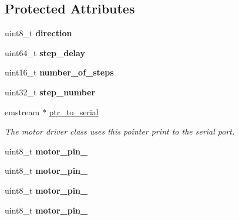 \subsection*{\-Protected \-Attributes}
\begin{DoxyCompactItemize}
\item 
\hypertarget{classStepper_a4ae0d2fd881970dd6a4b6e1a8334f691}{uint8\-\_\-t {\bfseries direction}}\label{classStepper_a4ae0d2fd881970dd6a4b6e1a8334f691}

\item 
\hypertarget{classStepper_a89678370d4e08ef2883e4e3d39f25859}{uint64\-\_\-t {\bfseries step\-\_\-delay}}\label{classStepper_a89678370d4e08ef2883e4e3d39f25859}

\item 
\hypertarget{classStepper_a927b4d28baddc7a61018e8e505e7d355}{uint16\-\_\-t {\bfseries number\-\_\-of\-\_\-steps}}\label{classStepper_a927b4d28baddc7a61018e8e505e7d355}

\item 
\hypertarget{classStepper_a5b613cc0dbed645425d86b7571316d8f}{uint32\-\_\-t {\bfseries step\-\_\-number}}\label{classStepper_a5b613cc0dbed645425d86b7571316d8f}

\item 
\hypertarget{classStepper_a2d66212be56a13730fd79853cf95e09f}{emstream $\ast$ \hyperlink{classStepper_a2d66212be56a13730fd79853cf95e09f}{ptr\-\_\-to\-\_\-serial}}\label{classStepper_a2d66212be56a13730fd79853cf95e09f}

\begin{DoxyCompactList}\small\item\em \-The motor driver class uses this pointer print to the serial port. \end{DoxyCompactList}\item 
\hypertarget{classStepper_aae97c5e4391150f951d06bf0261224be}{uint8\-\_\-t {\bfseries motor\-\_\-pin\-\_}}\label{classStepper_aae97c5e4391150f951d06bf0261224be}

\item 
\hypertarget{classStepper_a7587a846fb69d2d9ff5e262e6899b30e}{uint8\-\_\-t {\bfseries motor\-\_\-pin\-\_}}\label{classStepper_a7587a846fb69d2d9ff5e262e6899b30e}

\item 
\hypertarget{classStepper_a787bb30fd11e35cace30694337b27bac}{uint8\-\_\-t {\bfseries motor\-\_\-pin\-\_}}\label{classStepper_a787bb30fd11e35cace30694337b27bac}

\item 
\hypertarget{classStepper_a43ebe0d8705f01f7845bb3249d4f9f0a}{uint8\-\_\-t {\bfseries motor\-\_\-pin\-\_}}\label{classStepper_a43ebe0d8705f01f7845bb3249d4f9f0a}


\end{DoxyCompactItemize}
